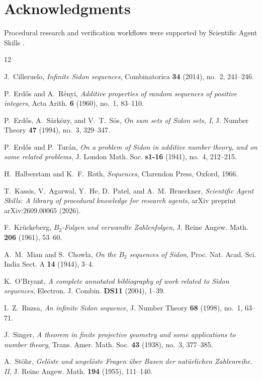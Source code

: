 \documentclass[11pt,reqno]{amsart}
\theoremstyle{definition}
\theoremstyle{remark}
\begin{document}
\section*{Acknowledgments}
Procedural research and verification workflows were supported by Scientific Agent Skills \cite{Kassis2026}.

\providecommand{\bysame}{\leavevmode\hbox to3em{\hrulefill}\thinspace}
\begin{thebibliography}{12}

J.~Cilleruelo, \emph{Infinite {Sidon} sequences}, Combinatorica \textbf{34} (2014), no.~2, 241--246.

P.~Erd{\H{o}}s and A.~R{\'e}nyi, \emph{Additive properties of random sequences of positive integers}, Acta Arith. \textbf{6} (1960), no.~1, 83--110.

P.~Erd{\H{o}}s, A.~S{\'a}rk{\"o}zy, and V.~T.~S{\'o}s, \emph{On sum sets of {Sidon} sets, {I}}, J. Number Theory \textbf{47} (1994), no.~3, 329--347.

P.~Erd{\H{o}}s and P.~Tur{\'a}n, \emph{On a problem of {Sidon} in additive number theory, and on some related problems}, J. London Math. Soc. \textbf{s1-16} (1941), no.~4, 212--215.

H.~Halberstam and K.~F.~Roth, \emph{Sequences}, Clarendon Press, Oxford, 1966.

T.~Kassis, V.~Agarwal, Y.~He, D.~Patel, and A.~M.~Brueckner, \emph{Scientific Agent Skills: A library of procedural knowledge for research agents}, arXiv preprint arXiv:2609.00065 (2026).

F.~Kr{\"u}ckeberg, \emph{$B_2$-{Folgen} und verwandte {Zahlenfolgen}}, J. Reine Angew. Math. \textbf{206} (1961), 53--60.

A.~M.~Mian and S.~Chowla, \emph{On the $B_2$ sequences of {Sidon}}, Proc. Nat. Acad. Sci. India Sect. A \textbf{14} (1944), 3--4.

K.~O'Bryant, \emph{A complete annotated bibliography of work related to {Sidon} sequences}, Electron. J. Combin. \textbf{DS11} (2004), 1--39.

I.~Z.~Ruzsa, \emph{An infinite {Sidon} sequence}, J. Number Theory \textbf{68} (1998), no.~1, 63--71.

J.~Singer, \emph{A theorem in finite projective geometry and some applications to number theory}, Trans. Amer. Math. Soc. \textbf{43} (1938), no.~3, 377--385.

A.~St{\"o}hr, \emph{Gel{\"o}ste und ungel{\"o}ste {Fragen} {\"u}ber {Basen} der nat{\"u}rlichen {Zahlenreihe}. {II}}, J. Reine Angew. Math. \textbf{194} (1955), 111--140.

\end{thebibliography}
\end{document}
